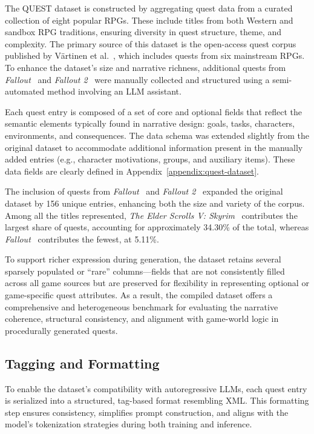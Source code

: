 The QUEST dataset is constructed by aggregating quest data from a curated collection
of eight popular RPGs. These include titles from both Western and sandbox RPG traditions,
ensuring diversity in quest structure, theme, and complexity. The primary source of
this dataset is the open-access quest corpus published by V{\"a}rtinen et al.~\cite{vartinen2022generating}, which
includes quests from six mainstream RPGs. To enhance the dataset's size and narrative
richness, additional quests from \textit{Fallout}~\cite{fallout1} and \textit{Fallout 2}~\cite{fallout2} were manually collected
and structured using a semi-automated method involving an LLM assistant.

Each quest entry is composed of a set of core and optional fields that reflect the semantic
elements typically found in narrative design: goals, tasks, characters, environments,
and consequences. The data schema was extended slightly from the original dataset to
accommodate additional information present in the manually added entries (e.g., character
motivations, groups, and auxiliary items). These data fields are clearly defined in
Appendix~\ref{appendix:quest-dataset}.

The inclusion of quests from \textit{Fallout}~\cite{fallout1} and \textit{Fallout 2}~\cite{fallout2} expanded the original dataset
by 156 unique entries, enhancing both the size and variety of the corpus. Among all the titles
represented, \textit{The Elder Scrolls V: Skyrim}~\cite{theelderscrollsvskyrim} contributes the
largest share of quests, accounting for approximately 34.30\% of the total, whereas \textit{Fallout}~\cite{fallout1} contributes the fewest, at 5.11\%.

To support richer expression during generation, the dataset retains several sparsely
populated or “rare” columns—fields that are not consistently filled across all game sources
but are preserved for flexibility in representing optional or game-specific quest attributes.
As a result, the compiled dataset offers a comprehensive and heterogeneous benchmark
for evaluating the narrative coherence, structural consistency, and alignment with game-world
logic in procedurally generated quests.

\subsection{Tagging and Formatting}

To enable the dataset's compatibility with autoregressive LLMs, each quest entry is serialized
into a structured, tag-based format resembling XML. This formatting step ensures
consistency, simplifies prompt construction, and aligns with the model's tokenization
strategies during both training and inference.

